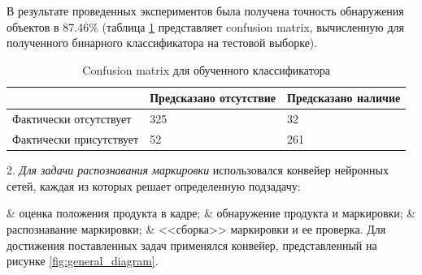 \documentclass{thesisby}
\begin{document}
В результате проведенных экспериментов была получена точность обнаружения объектов в 87.46\% (таблица \ref{table:solar_detection_cm} представляет confusion matrix, вычисленную для полученного бинарного классификатора на тестовой выборке).

\begin{table}[H]
	\caption{Confusion matrix для обученного классификатора}
	\label{table:solar_detection_cm}
	\centering
	\begin{tabular}{|p{6cm}|p{4cm}|p{4cm}|}
		\hline
		& \textbf{Предсказано отсутствие} & \textbf{Предсказано наличие}\\
		\hline
	    Фактически отсутствует & 325  & 32 \\
	    \hline
		Фактически присутствует & 52 & 261 \\
		\hline
	\end{tabular}			
\end{table}	

2. \textit{Для задачи распознавания маркировки} использовался конвейер нейронных сетей, каждая из которых решает определенную подзадачу:
\begin{easylistNum}
  & оценка положения продукта в кадре;
	& обнаружение продукта и маркировки;
	& распознавание маркировки;
	& <<сборка>> маркировки и ее проверка.
	Для достижения поставленных задач применялся конвейер, представленный на рисунке \ref{fig:general_diagram}.
\end{easylistNum}
 
\end{document}
